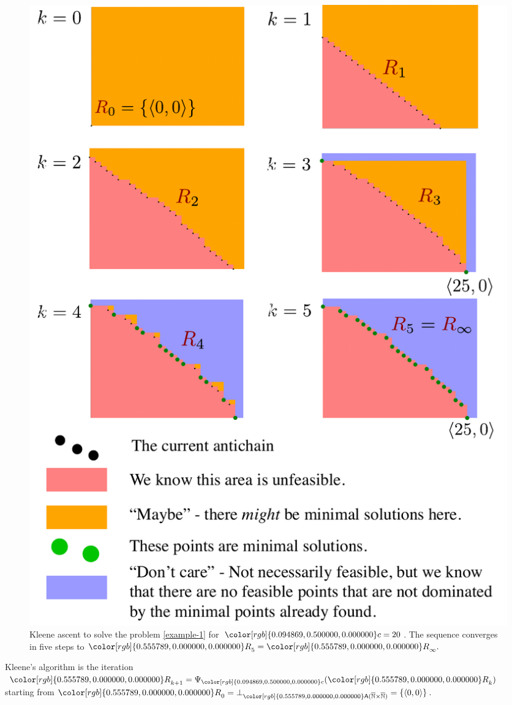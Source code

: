 \documentclass[twocolumn,english]{IEEEtran}
\theoremstyle{definition}
\theoremstyle{plain}
\theoremstyle{definition}
\theoremstyle{remark}
\theoremstyle{definition}
\theoremstyle{plain}
\theoremstyle{plain}
\newcommand{\aword}[1]{\mathsf{#1}}
\newcommand{\vmath}[1]{\aword{#1}}
\newcommand{\antichains}{\vmath{A}}
\newcommand{\colR}{\color[rgb]{0.555789,0.000000,0.000000}}
\newcommand{\colF}{\color[rgb]{0.094869,0.500000,0.000000}}
\newcommand{\R}[1]{{\colR #1}}
\newcommand{\F}[1]{{\colF #1}}
\begin{document}
\begin{figure}
\begin{centering}
\includegraphics[bb=0bp 0bp 458bp 621bp,clip,scale=0.5]{gmcdptro_example20}
\par\end{centering}
\caption{\label{fig:example24}Kleene ascent to solve the problem \eqref{example-1}
for $\F{c}=20$. The sequence converges in five steps to $\R{R}_{5}=\R{R}_{\infty}.$ }
\end{figure}

\noindent Kleene's algorithm is the iteration $\R{R}_{k+1}=\Psi_{\F{c}}(\R{R}_{k})$
starting from $\R{R}_{0}=\bot_{\R{\antichains(\overline{\mathbb{N}}\times\overline{\mathbb{N}})}}=\{\left\langle 0,0\right\rangle \}$.
\end{document}
